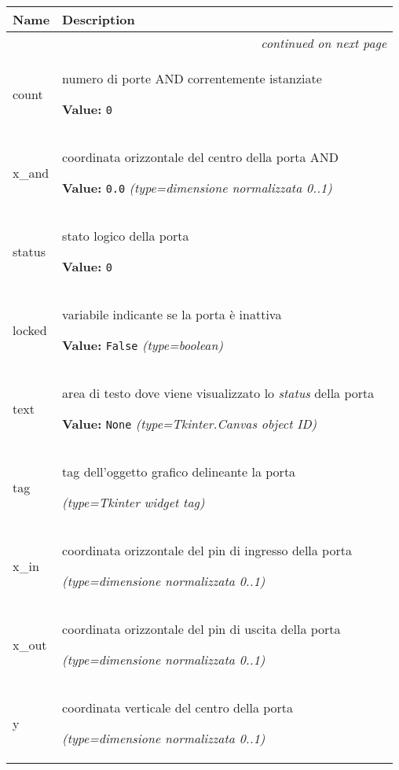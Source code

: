     \vspace{-1cm}
\hspace{\varindent}\begin{longtable}{|p{\varnamewidth}|p{\vardescrwidth}|l}
\cline{1-2}
\cline{1-2} \centering \textbf{Name} & \centering \textbf{Description}& \\
\cline{1-2}
\endhead\cline{1-2}\multicolumn{3}{r}{\small\textit{continued on next page}}\\\endfoot\cline{1-2}
\endlastfoot\raggedright c\-o\-u\-n\-t\- & \raggedright numero di porte AND correntemente istanziate

\textbf{Value:} 
{\tt 0}&\\
\cline{1-2}
\raggedright x\-\_\-a\-n\-d\- & \raggedright coordinata orizzontale del centro della porta AND

\textbf{Value:} 
{\tt 0.0}            {\it (type=dimensione normalizzata 0..1)}&\\
\cline{1-2}
\raggedright s\-t\-a\-t\-u\-s\- & \raggedright stato logico della porta

\textbf{Value:} 
{\tt 0}&\\
\cline{1-2}
\raggedright l\-o\-c\-k\-e\-d\- & \raggedright variabile indicante se la porta è inattiva

\textbf{Value:} 
{\tt False}            {\it (type=boolean)}&\\
\cline{1-2}
\raggedright t\-e\-x\-t\- & \raggedright area di testo dove viene visualizzato lo \textit{status} della 
          porta

\textbf{Value:} 
{\tt None}            {\it (type=Tkinter.Canvas object ID)}&\\
\cline{1-2}
\raggedright t\-a\-g\- & \raggedright tag dell'oggetto grafico delineante la porta

            {\it (type=Tkinter widget tag)}&\\
\cline{1-2}
\raggedright x\-\_\-i\-n\- & \raggedright coordinata orizzontale del pin di ingresso della porta

            {\it (type=dimensione normalizzata 0..1)}&\\
\cline{1-2}
\raggedright x\-\_\-o\-u\-t\- & \raggedright coordinata orizzontale del pin di uscita della porta

            {\it (type=dimensione normalizzata 0..1)}&\\
\cline{1-2}
\raggedright y\- & \raggedright coordinata verticale del centro della porta

            {\it (type=dimensione normalizzata 0..1)}&\\
\cline{1-2}
\end{longtable}

